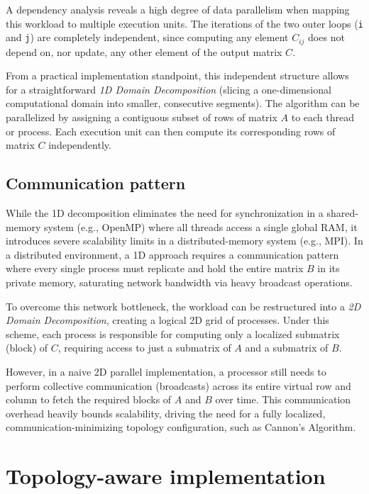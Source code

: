 \documentclass[
  12pt,
]{article}
\begin{document}
A dependency analysis reveals a high degree of data parallelism when
mapping this workload to multiple execution units. The iterations of the
two outer loops (\texttt{i} and \texttt{j}) are completely independent,
since computing any element \(C_{ij}\) does not depend on, nor update,
any other element of the output matrix \(C\).

From a practical implementation standpoint, this independent structure
allows for a straightforward \emph{1D Domain Decomposition} (slicing a
one-dimensional computational domain into smaller, consecutive
segments). The algorithm can be parallelized by assigning a contiguous
subset of rows of matrix \(A\) to each thread or process. Each execution
unit can then compute its corresponding rows of matrix \(C\)
independently.

\subsection{Communication pattern}\label{communication-pattern}

While the 1D decomposition eliminates the need for synchronization in a
shared-memory system (e.g., OpenMP) where all threads access a single
global RAM, it introduces severe scalability limits in a
distributed-memory system (e.g., MPI). In a distributed environment, a
1D approach requires a communication pattern where every single process
must replicate and hold the entire matrix \(B\) in its private memory,
saturating network bandwidth via heavy broadcast operations.

To overcome this network bottleneck, the workload can be restructured
into a \emph{2D Domain Decomposition}, creating a logical 2D grid of
processes. Under this scheme, each process is responsible for computing
only a localized submatrix (block) of \(C\), requiring access to just a
submatrix of \(A\) and a submatrix of \(B\).

However, in a naive 2D parallel implementation, a processor still needs
to perform collective communication (broadcasts) across its entire
virtual row and column to fetch the required blocks of \(A\) and \(B\)
over time. This communication overhead heavily bounds scalability,
driving the need for a fully localized, communication-minimizing
topology configuration, such as Cannon's Algorithm.

\section{Topology-aware
implementation}\label{topology-aware-implementation}
\end{document}
